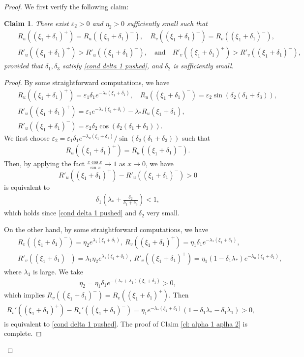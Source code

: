 \documentclass[11pt,a4paper]{article}
\newtheorem{claim}[theorem]{\textbf{Claim}}
\numberwithin{equation}{section}
\numberwithin{figure}{section}
\newcommand\beaa{\begin{eqnarray*}}
\newcommand\eeaa{\end{eqnarray*}}
\begin{document}
\begin{proof}
We first verify the following claim: %
\begin{claim}%
There exist %
$\varepsilon_2>0$ and $\eta_2>0$ sufficiently small
such that
\beaa
&&R_u((\xi_{1}+\delta_1)^+)=R_u((\xi_{1}+\delta_1)^-),\quad R_v((\xi_{1}+\delta_1)^+)=R_v((\xi_{1}+\delta_1)^-),\\ 
&&R'_u((\xi_{1}+\delta_1)^+)>R'_u((\xi_{1}+\delta_1)^-), \quad\text{and}\quad R'_v((\xi_{1}+\delta_1)^+)>R'_v((\xi_{1}+\delta_1)^-),
\eeaa
provided that  $\delta_1,\delta_3$ satisfy \eqref{cond delta 1 pushed},  and $\delta_2$ is sufficiently small.
\end{claim}
\begin{proof}
By some  straightforward computations, we have
\beaa
&&R_u((\xi_{1}+\delta_1)^+)=\varepsilon_1\delta_1e^{-\lambda_*(\xi_{1}+\delta_1)},\quad R_u((\xi_{1}+\delta_1)^-)=\varepsilon_2\sin(\delta_2(\delta_1+\delta_3)),\\
&&R'_u((\xi_{1}+\delta_1)^+)=\varepsilon_1e^{-\lambda_*(\xi_{1}+\delta_1)}-\lambda_*R_u(\xi_{1}+\delta_1),\\
&&R'_u((\xi_{1}+\delta_1)^-)=\varepsilon_2\delta_2\cos(\delta_2(\delta_1+\delta_3)).
\eeaa
We first choose %
$\varepsilon_2=\varepsilon_1\delta_1e^{-\lambda_u(\xi_{1}+\delta_1)}/\sin(\delta_2(\delta_1+\delta_3))$ such that
\beaa
R_u((\xi_{1}+\delta_1)^+)=R_u((\xi_{1}+\delta_1)^-).
\eeaa
Then, by applying  the fact $\frac{x\cos x}{\sin x}\to 1$ as $x\to 0$, we have 
$$R'_u((\xi_{1}+\delta_1)^+)-R'_u((\xi_{1}+\delta_1)^-)>0$$
 is equivalent to
\beaa
\delta_1(\lambda_*+\frac{\delta_2}{\delta_1+\delta_3})<1,
\eeaa
which holds since \eqref{cond delta 1 pushed} and $\delta_2$ very small.



On the other hand, by some  straightforward computations, we have
\beaa
&&R_v((\xi_{1}+\delta_1)^-)=\eta_2e^{\lambda_1(\xi_{1}+\delta_1)},\ R_v((\xi_{1}+\delta_1)^+)=\eta_1\delta_1e^{-\lambda_*(\xi_{1}+\delta_1)},\\
&&R'_v((\xi_{1}+\delta_1)^-)=\lambda_1\eta_2e^{\lambda_1(\xi_{1}+\delta_1)},\ R'_v((\xi_{1}+\delta_1)^+)=\eta_1(1-\delta_1\lambda_*)e^{-\lambda_u(\xi_{1}+\delta_1)},
\eeaa
where $\lambda_1$ is large.
We take
\beaa
\eta_2=\eta_1\delta_1e^{-(\lambda_*+\lambda_1)(\xi_{1}+\delta_1)}>0,
\eeaa
which implies $R_v((\xi_{1}+\delta_1)^-)=R_v((\xi_{1}+\delta_1)^+)$. Then
\beaa
R_v'((\xi_{1}+\delta_1)^+)-R_v'((\xi_{1}+\delta_1)^-)=\eta_1e^{-\lambda_*(\xi_1+\delta_1)}(1-\delta_1\lambda_*-\delta_1\lambda_1)>0,
\eeaa
is equivalent to \eqref{cond delta 1 pushed}.
The proof of Claim \ref{cl: alpha 1 aplha 2} is complete.
\end{proof}


\end{proof}
\end{document}

